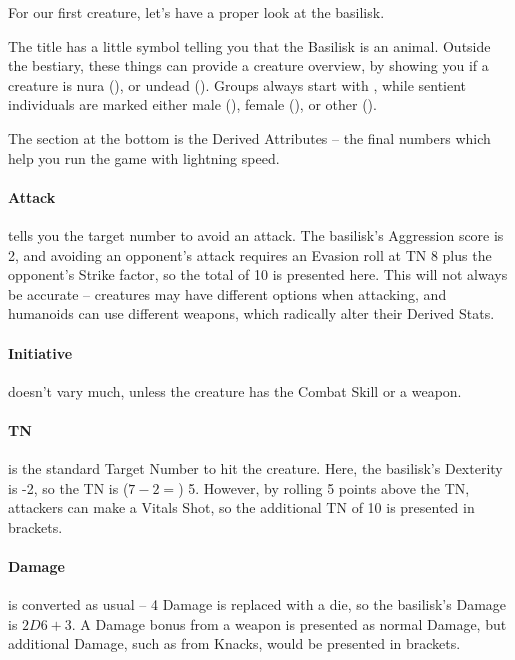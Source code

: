 \begin{multicols}{2}

For our first creature, let's have a proper look at the basilisk.

\basilisk

The title has a little symbol telling you that the Basilisk is an animal.
Outside the bestiary, these things can provide a creature overview, by showing you if a creature is  nura (\N), or undead (\D).
Groups always start with \T, while sentient individuals are marked either male (\M), female (\F), or other (\E).

The section at the bottom is the Derived Attributes -- the final numbers which help you run the game with lightning speed.

\paragraph{Attack} tells you the target number to avoid an attack.  The basilisk's Aggression score is 2, and avoiding an opponent's attack requires an Evasion roll at TN 8 plus the opponent's Strike factor, so the total of 10 is presented here.  This will not always be accurate -- creatures may have different options when attacking, and humanoids can use different weapons, which radically alter their Derived Stats.

\paragraph{Initiative} doesn't vary much, unless the creature has the Combat Skill or a weapon.

\paragraph{TN} is the standard Target Number to hit the creature.  Here, the basilisk's Dexterity is -2, so the TN is ($7 - 2 =$) 5.  However, by rolling 5 points above the TN, attackers can make a Vitals Shot, so the additional TN of 10 is presented in brackets.

\paragraph{Damage} is converted as usual -- 4 Damage is replaced with a die, so the basilisk's Damage is $2D6+3$.  A Damage bonus from a weapon is presented as normal Damage, but additional Damage, such as from Knacks, would be presented in brackets.


\end{multicols}
